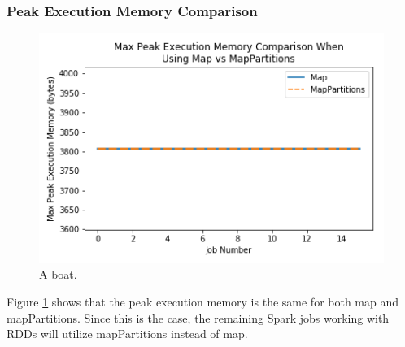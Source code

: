 \documentclass[conference]{IEEEtran}
\begin{document}
\subsubsection{Peak Execution Memory Comparison}
\begin{figure}
    \includegraphics[width=\linewidth]{../python_scripts/images/mapVsMapPartitionsMaxPeakExecutionMemory.png}
    \caption{A boat.}
    \label{fig:mapVMapPartitionsMaxPeakExecutionMemory}
\end{figure}

Figure \ref{fig:mapVMapPartitionsMaxPeakExecutionMemory} shows that the peak execution memory is the same for both map and mapPartitions.
Since this is the case, the remaining Spark jobs working with RDDs will utilize mapPartitions instead of map.


\end{document}
